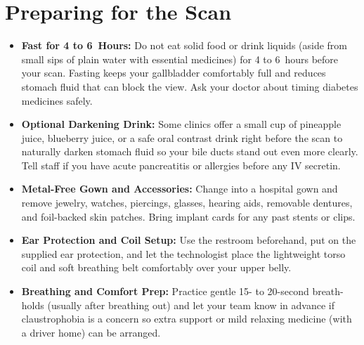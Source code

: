 \section{Preparing for the Scan}
\begin{itemize}
\item \textbf{Fast for 4 to 6~Hours:} Do not eat solid food or drink liquids (aside from small sips of plain water with essential medicines) for 4 to 6~hours before your scan. Fasting keeps your gallbladder comfortably full and reduces stomach fluid that can block the view. Ask your doctor about timing diabetes medicines safely.
\item \textbf{Optional Darkening Drink:} Some clinics offer a small cup of pineapple juice, blueberry juice, or a safe oral contrast drink right before the scan to naturally darken stomach fluid so your bile ducts stand out even more clearly. Tell staff if you have acute pancreatitis or allergies before any IV secretin.
\item \textbf{Metal-Free Gown and Accessories:} Change into a hospital gown and remove jewelry, watches, piercings, glasses, hearing aids, removable dentures, and foil-backed skin patches. Bring implant cards for any past stents or clips.
\item \textbf{Ear Protection and Coil Setup:} Use the restroom beforehand, put on the supplied ear protection, and let the technologist place the lightweight torso coil and soft breathing belt comfortably over your upper belly.
\item \textbf{Breathing and Comfort Prep:} Practice gentle 15- to 20-second breath-holds (usually after breathing out) and let your team know in advance if claustrophobia is a concern so extra support or mild relaxing medicine (with a driver home) can be arranged.
\end{itemize}

